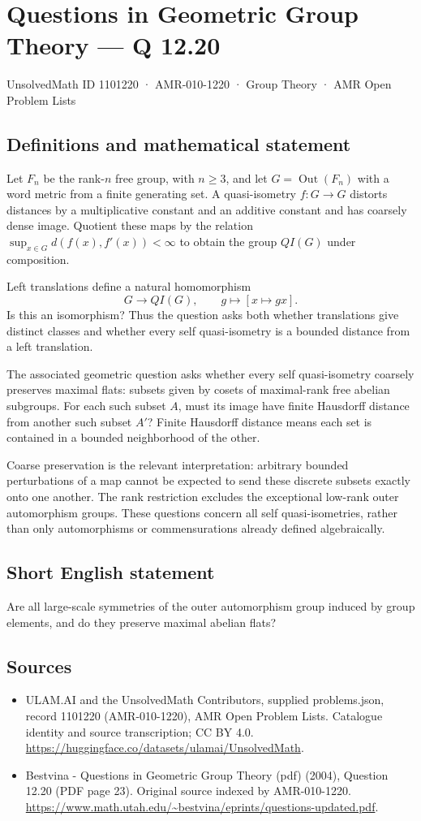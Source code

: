 \documentclass[11pt,a4paper]{article}
\begin{document}
\section*{Questions in Geometric Group Theory — Q 12.20}\label{1101220}
{\small UnsolvedMath ID 1101220 · AMR-010-1220 · Group Theory · AMR Open Problem Lists}
\subsection{Definitions and mathematical statement}
Let $F_n$ be the rank-$n$ free group, with $n\geq3$, and let $G=\operatorname{Out}(F_n)$ with a word metric from a finite generating set. A quasi-isometry $f:G\to G$ distorts distances by a multiplicative constant and an additive constant and has coarsely dense image. Quotient these maps by the relation $\sup_{x\in G}d(f(x),f'(x))<\infty$ to obtain the group $QI(G)$ under composition.

Left translations define a natural homomorphism
\[
 G\longrightarrow QI(G),\qquad g\longmapsto [x\mapsto gx].
\]
Is this an isomorphism? Thus the question asks both whether translations give distinct classes and whether every self quasi-isometry is a bounded distance from a left translation.

The associated geometric question asks whether every self quasi-isometry coarsely preserves maximal flats: subsets given by cosets of maximal-rank free abelian subgroups. For each such subset $A$, must its image have finite Hausdorff distance from another such subset $A'$? Finite Hausdorff distance means each set is contained in a bounded neighborhood of the other.

Coarse preservation is the relevant interpretation: arbitrary bounded perturbations of a map cannot be expected to send these discrete subsets exactly onto one another. The rank restriction excludes the exceptional low-rank outer automorphism groups. These questions concern all self quasi-isometries, rather than only automorphisms or commensurations already defined algebraically.
\subsection{Short English statement}
Are all large-scale symmetries of the outer automorphism group induced by group elements, and do they preserve maximal abelian flats?
\subsection{Sources}
\begin{itemize}
\item[S1] ULAM.AI and the UnsolvedMath Contributors, supplied problems.json, record 1101220 (AMR-010-1220), AMR Open Problem Lists. Catalogue identity and source transcription; CC BY 4.0.
\url{https://huggingface.co/datasets/ulamai/UnsolvedMath}.
\item[S2] Bestvina - Questions in Geometric Group Theory (pdf) (2004), Question 12.20 (PDF page 23). Original source indexed by AMR-010-1220.
\url{https://www.math.utah.edu/~bestvina/eprints/questions-updated.pdf}.
\end{itemize}
\end{document}
